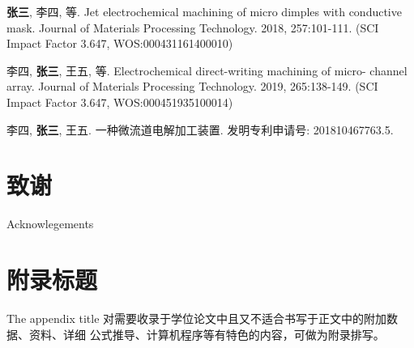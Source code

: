 \documentclass[
  type=master
]{gdutthesis}
\begin{document}
\begin{results}
  \item \textbf{张三}, 李四, 等. Jet electrochemical machining of micro dimples with conductive mask.
  Journal of Materials Processing Technology. 2018, 257:101-111. (SCI Impact Factor 3.647,
  WOS:000431161400010)
  \item 李四, \textbf{张三}, 王五, 等. Electrochemical direct-writing machining of micro- channel array.
  Journal of Materials Processing Technology. 2019, 265:138-149. (SCI Impact Factor 3.647,
  WOS:000451935100014)
\end{results}


\begin{results}
  \item 李四, \textbf{张三}, 王五. 一种微流道电解加工装置. 发明专利申请号: 201810467763.5.
\end{results}

\gdutstatement

\chapter{致谢}{Acknowlegements}
\zhlipsum[1]

\gdutappendix

\chapter{附录标题}{The appendix title}
对需要收录于学位论文中且又不适合书写于正文中的附加数据、资料、详细
公式推导、计算机程序等有特色的内容，可做为附录排写。
\end{document}
